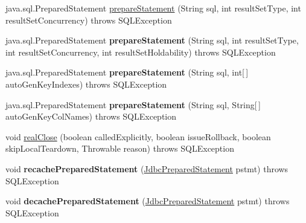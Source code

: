 \begin{DoxyCompactItemize}
\item 
java.\+sql.\+Prepared\+Statement \mbox{\hyperlink{classcom_1_1mysql_1_1cj_1_1jdbc_1_1_connection_impl_a9673b3a241062ca773bdc76af945f62e}{prepare\+Statement}} (String sql, int result\+Set\+Type, int result\+Set\+Concurrency)  throws S\+Q\+L\+Exception 
\item 
\mbox{\label{classcom_1_1mysql_1_1cj_1_1jdbc_1_1_connection_impl_a15678f2d8c486faa6825b6e7f5bee3fd}} 
java.\+sql.\+Prepared\+Statement {\bfseries prepare\+Statement} (String sql, int result\+Set\+Type, int result\+Set\+Concurrency, int result\+Set\+Holdability)  throws S\+Q\+L\+Exception 
\item 
\mbox{\label{classcom_1_1mysql_1_1cj_1_1jdbc_1_1_connection_impl_abcca64304550ee544abe022189a9d8ea}} 
java.\+sql.\+Prepared\+Statement {\bfseries prepare\+Statement} (String sql, int\mbox{[}$\,$\mbox{]} auto\+Gen\+Key\+Indexes)  throws S\+Q\+L\+Exception 
\item 
\mbox{\label{classcom_1_1mysql_1_1cj_1_1jdbc_1_1_connection_impl_ad765192f2c6f1753689fb86876ed43d3}} 
java.\+sql.\+Prepared\+Statement {\bfseries prepare\+Statement} (String sql, String\mbox{[}$\,$\mbox{]} auto\+Gen\+Key\+Col\+Names)  throws S\+Q\+L\+Exception 
\item 
void \mbox{\hyperlink{classcom_1_1mysql_1_1cj_1_1jdbc_1_1_connection_impl_a8a78dfbe0aa7dd8b881a9f9716f16ed6}{real\+Close}} (boolean called\+Explicitly, boolean issue\+Rollback, boolean skip\+Local\+Teardown, Throwable reason)  throws S\+Q\+L\+Exception 
\item 
\mbox{\label{classcom_1_1mysql_1_1cj_1_1jdbc_1_1_connection_impl_a7c4a014cd0c2d58c91a091ec4976434c}} 
void {\bfseries recache\+Prepared\+Statement} (\mbox{\hyperlink{interfacecom_1_1mysql_1_1cj_1_1jdbc_1_1_jdbc_prepared_statement}{Jdbc\+Prepared\+Statement}} pstmt)  throws S\+Q\+L\+Exception 
\item 
\mbox{\label{classcom_1_1mysql_1_1cj_1_1jdbc_1_1_connection_impl_a06f0c5a49bcacd787553162a3926b1b7}} 
void {\bfseries decache\+Prepared\+Statement} (\mbox{\hyperlink{interfacecom_1_1mysql_1_1cj_1_1jdbc_1_1_jdbc_prepared_statement}{Jdbc\+Prepared\+Statement}} pstmt)  throws S\+Q\+L\+Exception 

\end{DoxyCompactItemize}
